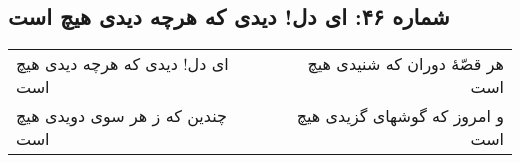 \begin{center}
\section*{شماره ۴۶: ای دل! دیدی که هرچه دیدی هیچ است}
\label{sec:046}
\begin{longtable}{l p{0.5cm} r}
ای دل! دیدی که هرچه دیدی هیچ است
&&
هر قصّهٔ دوران که شنیدی هیچ است
\\
چندین که ز هر سوی دویدی هیچ است
&&
و امروز که گوشهای گزیدی هیچ است
\\
\end{longtable}
\end{center}
